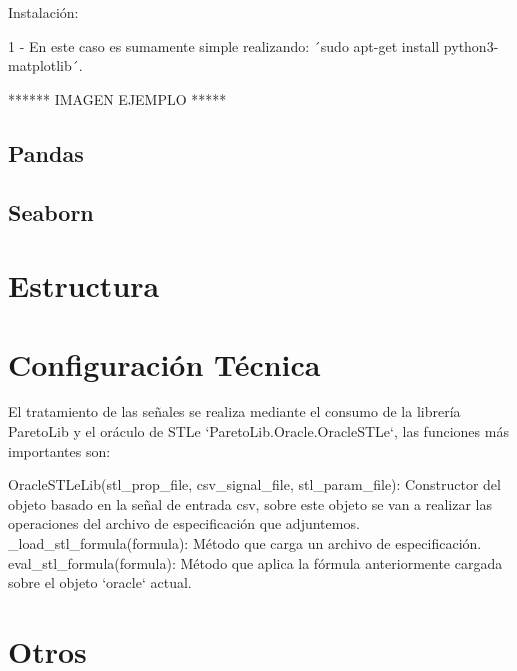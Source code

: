 Instalación: 
 
1 - En este caso es sumamente simple realizando: ´sudo apt-get install python3-matplotlib´.
 
****** IMAGEN EJEMPLO *****
 
\subsection{Pandas}

\subsection{Seaborn} 


\section{Estructura}
 
 
\section{Configuración Técnica}
El tratamiento de las señales se realiza mediante el consumo de la librería ParetoLib y el oráculo de STLe `ParetoLib.Oracle.OracleSTLe`, las funciones más importantes son: 
 
OracleSTLeLib(stl_prop_file, csv_signal_file, stl_param_file): Constructor del objeto basado en la señal de entrada csv, sobre este objeto se van a realizar las operaciones del archivo de especificación que adjuntemos. 
_load_stl_formula(formula): Método que carga un archivo de especificación. 
eval_stl_formula(formula): Método que aplica la fórmula anteriormente cargada sobre el objeto `oracle` actual.
 
 
 
 
 
\section{Otros}